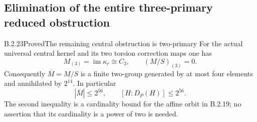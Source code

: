 \subsection{Elimination of the entire three-primary reduced obstruction}

\begin{result}{B.2.23}{Proved}{The remaining central obstruction is two-primary}
For the actual universal central kernel and its two
torsion correction maps one has
\[
 M_{(3)}=\operatorname{im}\kappa_r\cong C_3,
                    \qquad (M/S)_{(3)}=0.                    \tag{B.S55}
\]
Consequently $\overline M=M/S$ is a finite two-group
generated by at most four elements and annihilated
by $2^{14}$.  In particular
\[
 |\overline M|\leq 2^{56},
                   \qquad [H:D_P(H)]\leq 2^{56}.              \tag{B.S56}
\]
The second inequality is a cardinality bound for
the affine orbit in B.2.19; no assertion that its
cardinality is a power of two is needed.
\end{result}

